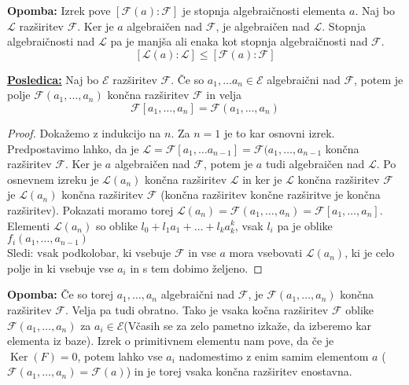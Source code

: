 \documentclass[a4paper]{article}
\newcounter{environment:definition_counter}
\newcounter{environment:theorem_counter}
\newcounter{environment:statement_counter}
\newenvironment{remark}
{\textbf{Opomba:}}
{}
\newenvironment{corollary}
{\underline{\textbf{Posledica:}}}
{}
\renewcommand{\ker}{\ensuremath{\operatorname{Ker}}} %
\begin{document}
\begin{remark}
Izrek pove $[\mathcal{F}(a):\mathcal{F}]$ je stopnja algebraičnosti elementa $a$. Naj bo $\mathcal{L}$ razširitev $\mathcal{F}$. Ker je $a$ algebraičen nad $\mathcal{F}$, je algebraičen nad $\mathcal{L}$. Stopnja algebraičnosti nad $\mathcal{L}$ pa je manjša ali enaka kot stopnja algebraičnosti nad $\mathcal{F}$. $$[\mathcal{L}(a):\mathcal{L}] \leq [\mathcal{F}(a):\mathcal{F}]$$
\end{remark}

\begin{corollary}
Naj bo $\mathcal{E}$ razširitev $\mathcal{F}$. Če so $a_1, \dots a_n \in \mathcal{E}$ algebraični nad $\mathcal{F}$, potem je polje $\mathcal{F}(a_1, \dots, a_n)$ končna razširitev $\mathcal{F}$ in velja $$\mathcal{F}[a_1, \dots, a_n] = \mathcal{F}(a_1, \dots, a_n)$$
\end{corollary}

\begin{proof}
Dokažemo z indukcijo na $n$. Za $n = 1$ je to kar osnovni izrek.\\
Predpostavimo lahko, da je $\mathcal{L} = \mathcal{F}[a_1, \dots a_{n-1}] = \mathcal{F}(a_1, \dots, a_{n-1}$ končna razširitev $\mathcal{F}$. Ker je $a$ algebraičen nad $\mathcal{F}$, potem je $a$ tudi algebraičen nad $\mathcal{L}$. Po osnevnem izreku je $\mathcal{L}(a_n)$ končna razširitev $\mathcal{L}$ in ker je $\mathcal{L}$ končna razširitev $\mathcal{F}$ je $\mathcal{L}(a_n)$ končna razširitev $\mathcal{F}$ (končna razširitev končne razširitve je končna razširitev). Pokazati moramo torej $\mathcal{L}(a_n) = \mathcal{F}(a_1, \dots, a_n) = \mathcal{F}[a_1, \dots, a_n]$. Elementi $\mathcal{L}(a_n)$ so oblike $l_0 + l_1a_1 + \dots + l_ka_{k}^k$, vsak $l_i$ pa je oblike $f_i(a_1, \dots, a_{n-1})$ \\
Sledi: vsak podkolobar, ki vsebuje $\mathcal{F}$ in vse $a$ mora vsebovati $\mathcal{L}(a_n)$, ki je celo polje in ki vsebuje vse $a_i$ in s tem dobimo željeno.

\end{proof}

\begin{remark}
Če so torej $a_1, \dots, a_n$ algebraični nad $\mathcal{F}$, je $\mathcal{F}(a_1, \dots, a_n)$ končna razširitev $\mathcal{F}$. Velja pa tudi obratno. Tako je vsaka kočna razširitev $\mathcal{F}$ oblike $\mathcal{F}(a_1, \dots, a_n)$ za $a_i \in \mathcal{E}$(Včasih se za zelo pametno izkaže, da izberemo kar elementa iz baze). Izrek o primitivnem elementu nam pove, da če je $\ker(F) = 0$, potem lahko vse $a_i$ nadomestimo z enim samim elementom $a$ ($\mathcal{F}(a_1, \dots, a_n) = \mathcal{F}(a)$) in je torej vsaka končna razširitev enostavna. 
\end{remark}
\end{document}
